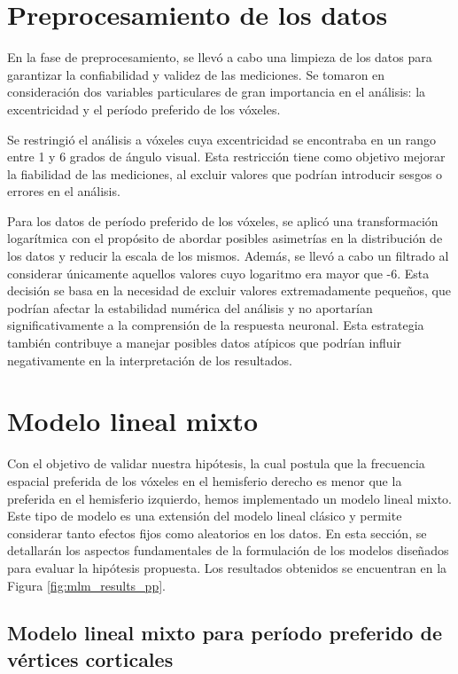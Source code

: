 \section{Preprocesamiento de los datos}

En la fase de preprocesamiento, se llevó a cabo una limpieza de los datos para garantizar la confiabilidad y validez de las mediciones. Se tomaron en consideración dos variables particulares de gran importancia en el análisis: la excentricidad y el período preferido de los v\'oxeles.

Se restringi\'o el análisis a v\'oxeles cuya excentricidad se encontraba en un rango entre 1 y 6 grados de \'angulo visual. Esta restricción tiene como objetivo mejorar la fiabilidad de las mediciones, al excluir valores que podrían introducir sesgos o errores en el análisis.

Para los datos de período preferido de los v\'oxeles, se aplicó una transformación logarítmica con el propósito de abordar posibles asimetrías en la distribución de los datos y reducir la escala de los mismos. Además, se llevó a cabo un filtrado al considerar únicamente aquellos valores cuyo logaritmo era mayor que -6. Esta decisión se basa en la necesidad de excluir valores extremadamente pequeños, que podrían afectar la estabilidad numérica del análisis y no aportarían significativamente a la comprensión de la respuesta neuronal. Esta estrategia también contribuye a manejar posibles datos atípicos que podrían influir negativamente en la interpretación de los resultados.

\section{Modelo lineal mixto}
\label{mlm}
Con el objetivo de validar nuestra hipótesis, la cual postula que la frecuencia espacial preferida de los v\'oxeles en el hemisferio derecho es menor que la preferida en el hemisferio izquierdo, hemos implementado un modelo lineal mixto. Este tipo de modelo es una extensión del modelo lineal clásico y permite considerar tanto efectos fijos como aleatorios en los datos. En esta sección, se detallarán los aspectos fundamentales de la formulación de los modelos diseñados para evaluar la hipótesis propuesta. Los resultados obtenidos se encuentran en la Figura \ref{fig:mlm_results_pp}.

\subsection{Modelo lineal mixto para per\'iodo preferido de v\'ertices corticales}

